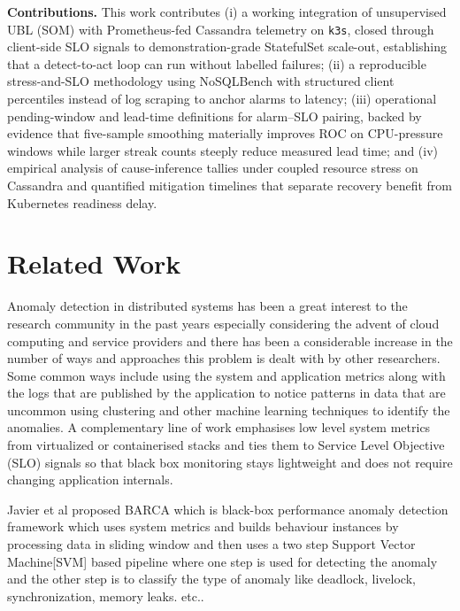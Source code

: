 \documentclass[sigconf]{acmart}
\begin{document}
\textbf{Contributions.}
This work contributes (i) a working integration of unsupervised UBL (SOM) with Prometheus-fed Cassandra telemetry on \texttt{k3s}, closed through client-side SLO signals to demonstration-grade StatefulSet scale-out, establishing that a detect-to-act loop can run without labelled failures; (ii) a reproducible stress-and-SLO methodology using NoSQLBench with structured client percentiles instead of log scraping to anchor alarms to latency; (iii) operational pending-window and lead-time definitions for alarm--SLO pairing, backed by evidence that five-sample smoothing materially improves ROC on CPU-pressure windows while larger streak counts steeply reduce measured lead time; and (iv) empirical analysis of cause-inference tallies under coupled resource stress on Cassandra and quantified mitigation timelines that separate recovery benefit from Kubernetes readiness delay.

\section{Related Work}



Anomaly detection in distributed systems has been a great interest to the research community in the past years especially considering the advent of cloud computing and service providers and there has been a considerable increase in the number of ways and approaches this problem is dealt with by other researchers. Some common ways include using the system and application metrics along with the logs that are published by the application to notice patterns in data that are uncommon using clustering and other machine learning techniques to identify the anomalies. A complementary line of work emphasises low level system metrics from virtualized or containerised stacks and ties them to Service Level Objective (SLO) signals so that black box monitoring stays lightweight and does not require changing application internals.

Javier et al proposed BARCA which is black-box performance anomaly detection framework which uses system metrics and builds behaviour instances by processing data in sliding window and then uses a two step Support Vector Machine[SVM] based pipeline where one step is used for detecting the anomaly and the other step is to classify the type of anomaly like deadlock, livelock, synchronization, memory leaks. etc..\cite{8329134}
\end{document}
